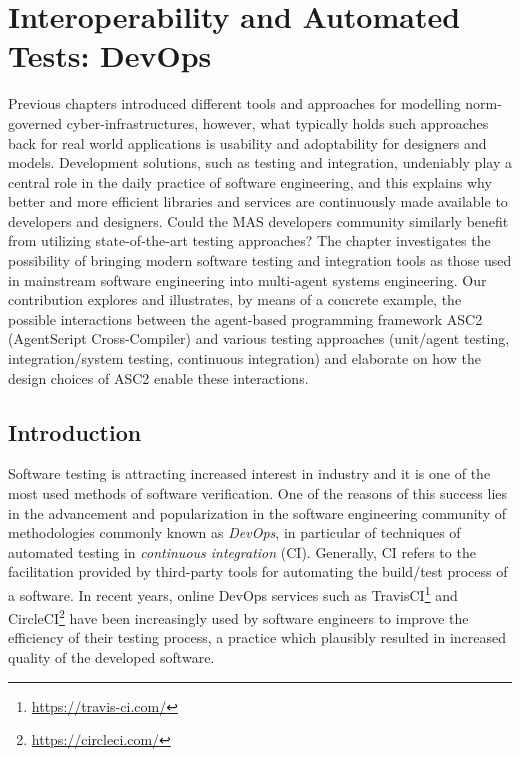 \chapter{Interoperability and Automated Tests: DevOps}
\label{ch:devops}

Previous chapters introduced different tools and approaches for modelling norm-governed cyber-infrastructures, however, what typically holds such approaches back for real world applications is usability and adoptability for designers and models. Development solutions, such as testing and integration, undeniably play a central role in the daily practice of software engineering, and this explains why better and more efficient libraries and services are continuously made available to developers and designers. Could the MAS developers community similarly benefit from utilizing state-of-the-art testing approaches? The chapter investigates the possibility of bringing  modern software testing and integration tools as those used in mainstream software engineering into multi-agent systems engineering. Our contribution explores and illustrates, by means of a concrete example, the possible interactions between the agent-based programming framework ASC2 (AgentScript Cross-Compiler)  and various testing approaches (unit/agent testing, integration/system testing, continuous integration) and elaborate on how the design choices of ASC2 enable these interactions.


\section{Introduction}

Software testing is attracting increased interest in industry \cite{market_reports_2019} and it is one of the most used methods of software verification. One of the reasons of this success lies in the advancement and popularization in the software engineering community of methodologies commonly known as \textit{DevOps}, in particular of techniques of automated testing in \textit{continuous integration} (CI). Generally, CI refers to the facilitation provided by third-party tools for automating the build/test process of a software. In recent years, online DevOps services such as TravisCI\footnote{\url{https://travis-ci.com/}} and CircleCI\footnote{\url{https://circleci.com/}} have been increasingly used by software engineers to improve the efficiency of their testing process, a practice which plausibly resulted in increased quality of the developed software.

